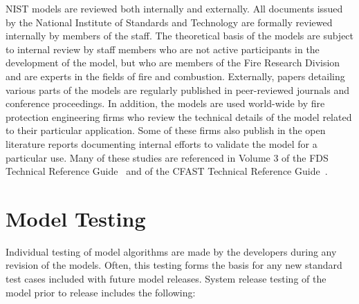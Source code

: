 \documentclass[11pt]{book}
\begin{document}
NIST models are reviewed both internally and externally. All documents issued by the National Institute of Standards and Technology are formally reviewed internally by members of the staff. The theoretical basis of the models are subject to internal review by staff members who are not active participants in the development of the model, but who are members of the Fire Research Division and are experts in the fields of fire and combustion. Externally, papers detailing various parts of the models are regularly published in peer-reviewed journals and conference proceedings. In addition, the models are used world-wide by fire protection engineering firms who review the technical details of the model related to their particular application. Some of these firms also publish in the open literature reports documenting internal efforts to validate the model for a particular use. Many of these studies are referenced in Volume 3 of the FDS Technical Reference Guide~\cite{FDS_Tech_Guide} and of the CFAST Technical Reference Guide~\cite{CFAST_Tech_Guide_7}.



\section{Model Testing}

Individual testing of model algorithms are made by the developers during any revision of the models. Often, this testing forms the basis for any new standard test cases included with future model releases. System release testing of the model prior to release includes the following:
\end{document}
